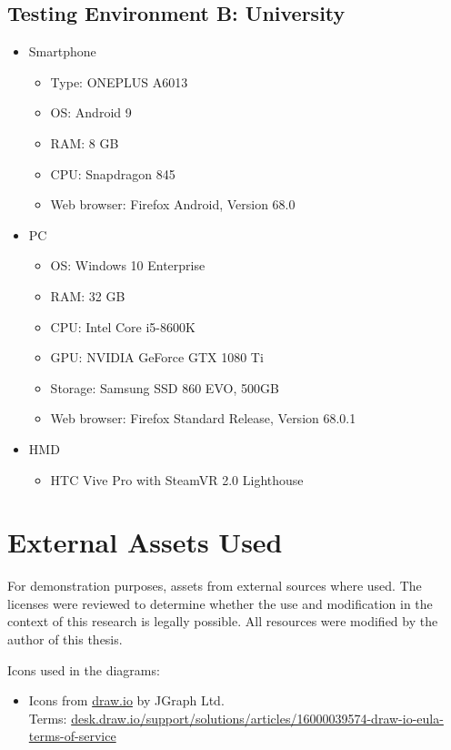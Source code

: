 \begin{appendices}
  \section{Testing Environment B: University}
  \begin{itemize}
    \item Smartphone
    \begin{itemize}
      \item Type: ONEPLUS A6013
      \item \gls{OS}: Android 9
      \item RAM: 8 GB
      \item CPU: Snapdragon 845 %
      \item Web browser: Firefox Android, Version 68.0
    \end{itemize}
    \item \gls{PC}
    \begin{itemize}
      \item \gls{OS}: Windows 10 Enterprise
      \item RAM: 32 GB
      \item CPU: Intel Core i5-8600K %
      \item GPU: NVIDIA GeForce GTX 1080 Ti
      \item Storage: Samsung SSD 860 EVO, 500GB
      \item Web browser: Firefox Standard Release, Version 68.0.1
    \end{itemize}
    \item \gls{HMD}
    \begin{itemize}
      \item HTC Vive Pro with SteamVR 2.0 Lighthouse
    \end{itemize}
  \end{itemize}

  \chapter{External Assets Used}\label{chapter:external-assets-used}
  
  For demonstration purposes, assets from external sources where used. The licenses were reviewed to determine whether the use and modification in the context of this research is legally possible. All resources were modified by the author of this thesis.

  Icons used in the diagrams:
  \begin{itemize}
    \item Icons from \href{https://www.draw.io/}{draw.io} by JGraph Ltd.\\Terms: \href{https://desk.draw.io/support/solutions/articles/16000039574-draw-io-eula-terms-of-service}{desk.draw.io/support/solutions/articles/16000039574-draw-io-eula-terms-of-service}
  \end{itemize}


\end{appendices}
